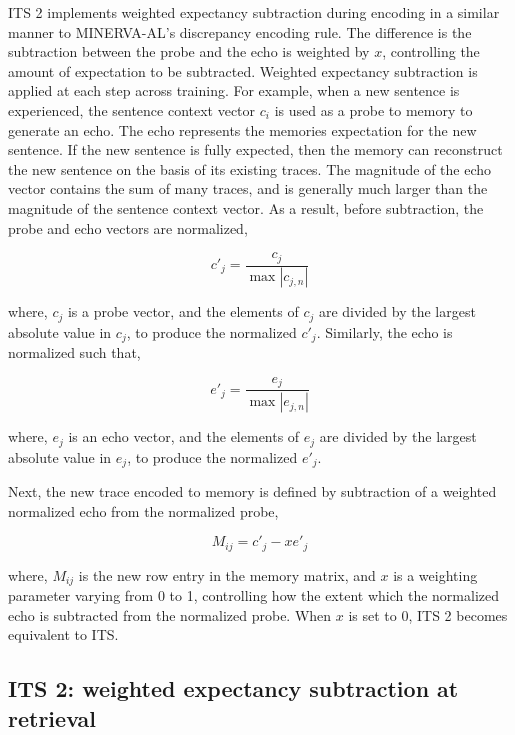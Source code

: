 \documentclass[
  jou]{apa6}
\begin{document}
ITS 2 implements weighted expectancy subtraction during encoding in a similar manner to MINERVA-AL's discrepancy encoding rule. The difference is the subtraction between the probe and the echo is weighted by \(x\), controlling the amount of expectation to be subtracted. Weighted expectancy subtraction is applied at each step across training. For example, when a new sentence is experienced, the sentence context vector \(c_i\) is used as a probe to memory to generate an echo. The echo represents the memories expectation for the new sentence. If the new sentence is fully expected, then the memory can reconstruct the new sentence on the basis of its existing traces. The magnitude of the echo vector contains the sum of many traces, and is generally much larger than the magnitude of the sentence context vector. As a result, before subtraction, the probe and echo vectors are normalized,

\begin{equation}
c'_j = \frac{c_j}{\max | c_{j,n} |}
\label{eq:normprobe}
\end{equation}

where, \(c_j\) is a probe vector, and the elements of \(c_j\) are divided by the largest absolute value in \(c_j\), to produce the normalized \(c'_j\). Similarly, the echo is normalized such that,

\begin{equation}
e'_j = \frac{e_j}{\max | e_{j,n} |}
\label{eq:normecho}
\end{equation}

where, \(e_j\) is an echo vector, and the elements of \(e_j\) are divided by the largest absolute value in \(e_j\), to produce the normalized \(e'_j\).

Next, the new trace encoded to memory is defined by subtraction of a weighted normalized echo from the normalized probe,

\begin{equation}
M_{ij} = c'_j  - xe'_j
\label{eq:ITS2encoding}
\end{equation}

where, \(M_{ij}\) is the new row entry in the memory matrix, and \(x\) is a weighting parameter varying from 0 to 1, controlling how the extent which the normalized echo is subtracted from the normalized probe. When \(x\) is set to 0, ITS 2 becomes equivalent to ITS.

\hypertarget{its-2-weighted-expectancy-subtraction-at-retrieval}{%
\subsection{ITS 2: weighted expectancy subtraction at retrieval}\label{its-2-weighted-expectancy-subtraction-at-retrieval}}
\end{document}
